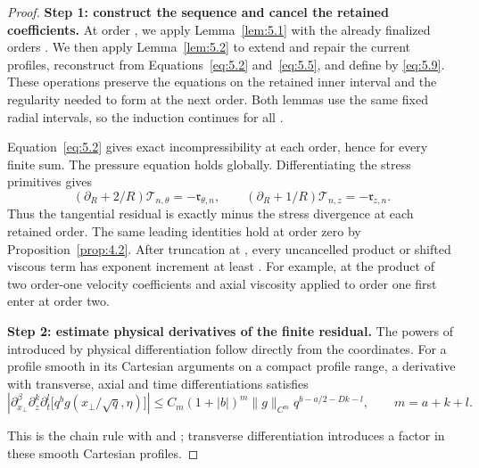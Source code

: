 \begin{proof}
\textbf{Step 1: construct the sequence and cancel the retained coefficients.}
At order , we apply Lemma~\ref{lem:5.1} with the already finalized orders
. We then apply Lemma~\ref{lem:5.2} to extend and repair the
current profiles, reconstruct  from Equations~\eqref{eq:5.2}
and~\eqref{eq:5.5}, and define  by \eqref{eq:5.9}. These
operations preserve the equations on the retained inner interval and the regularity needed to
form  at the next order. Both lemmas use the same fixed radial
intervals, so the induction continues for all .

Equation~\eqref{eq:5.2} gives exact incompressibility at each order, hence for every finite sum.
The pressure equation holds globally. Differentiating the stress primitives gives
\[
 (\partial_R+2/R)\mathcal T_{n,\theta}=-\mathfrak r_{\theta,n},
 \qquad
 (\partial_R+1/R)\mathcal T_{n,z}=-\mathfrak r_{z,n}.
\]
Thus the tangential residual is exactly minus the stress divergence at each retained order.
The same leading identities hold at order zero by Proposition~\ref{prop:4.2}. After truncation at
, every uncancelled product or shifted viscous term has exponent increment
at least . For example, at  the product of
two order-one velocity coefficients and axial viscosity applied to order one first enter at order
two.

\textbf{Step 2: estimate physical derivatives of the finite residual.}
The powers of  introduced by physical differentiation follow directly from
the coordinates. For a profile  smooth in its Cartesian
arguments on a compact profile range, a derivative with  transverse,
 axial and  time differentiations satisfies
\begin{equation}
 \left|\partial_{x_\perp}^{\beta}\partial_z^k\partial_t^l
 \bigl[q^b g(x_\perp/\sqrt q,\eta)\bigr]\right|
 \leq C_m(1+|b|)^m\|g\|_{C^m}q^{b-a/2-Dk-l},
 \qquad m=a+k+l.
 \tag{5.26}\label{eq:5.26}
\end{equation}

%
This is the chain rule with
and
;
transverse differentiation introduces a factor  in these smooth
Cartesian profiles.


\end{proof}
